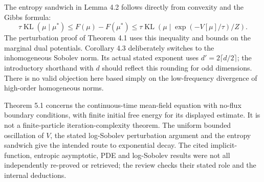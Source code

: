 \documentclass[10pt]{article}
\begin{document}
The entropy sandwich in Lemma 4.2 follows directly from convexity and the Gibbs formula: \[\tau\mathop{\mathrm{KL}}(\mu\mid\mu^*)\le F(\mu)-F(\mu^*)
       \le\tau\mathop{\mathrm{KL}}(\mu\mid\exp(-V[\mu]/\tau)/Z).\] The perturbation proof of Theorem 4.1 uses this inequality and bounds on the marginal dual potentials. Corollary 4.3 deliberately switches to the inhomogeneous Sobolev norm. Its actual stated exponent uses \(d'=2\lceil d/2\rceil\); the introductory shorthand with \(d\) should reflect this rounding for odd dimensions. There is no valid objection here based simply on the low-frequency divergence of high-order homogeneous norms.\par
Theorem 5.1 concerns the continuous-time mean-field equation with no-flux boundary conditions, with finite initial free energy for its displayed estimate. It is not a finite-particle iteration-complexity theorem. The uniform bounded oscillation of \(V\), the stated log-Sobolev perturbation argument and the entropy sandwich give the intended route to exponential decay. The cited implicit-function, entropic asymptotic, PDE and log-Sobolev results were not all independently re-proved or retrieved; the review checks their stated role and the internal deductions.\par
\end{document}
